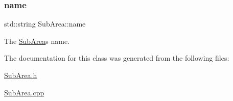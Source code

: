 \subsubsection{\texorpdfstring{name}{name}}
{\footnotesize\ttfamily std\+::string Sub\+Area\+::name\hspace{0.3cm}{\ttfamily [private]}}



The \mbox{\hyperlink{classSubArea}{Sub\+Area}}\textquotesingle{}s name. 



The documentation for this class was generated from the following files\+:\begin{DoxyCompactItemize}
\item 
\mbox{\hyperlink{SubArea_8h}{Sub\+Area.\+h}}\item 
\mbox{\hyperlink{SubArea_8cpp}{Sub\+Area.\+cpp}}\end{DoxyCompactItemize}
